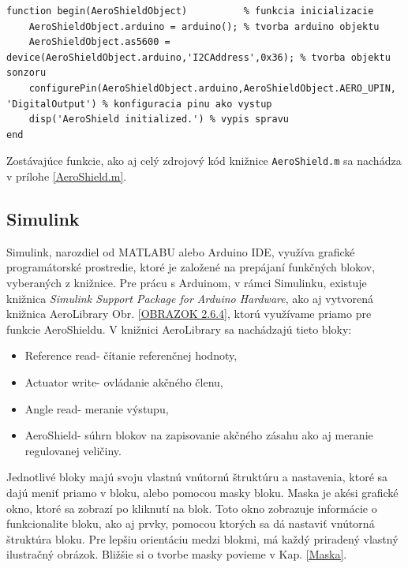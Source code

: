 \begin{lstlisting}[caption={Knižnica AeroShield.m properties.},captionpos=b]
function begin(AeroShieldObject)          % funkcia inicializacie
	AeroShieldObject.arduino = arduino(); % tvorba arduino objektu
	AeroShieldObject.as5600 = device(AeroShieldObject.arduino,'I2CAddress',0x36); % tvorba objektu sonzoru
	configurePin(AeroShieldObject.arduino,AeroShieldObject.AERO_UPIN, 'DigitalOutput') % konfiguracia pinu ako vystup
	disp('AeroShield initialized.') % vypis spravu
end
\end{lstlisting}

Zostávajúce funkcie, ako aj celý zdrojový kód knižnice \verb|AeroShield.m| sa nachádza v prílohe \ref{AeroShield.m}. 

\newpage
\subsection{Simulink}
\label{SimulinkLib}

Simulink, narozdiel od MATLABU alebo Arduino IDE, využíva grafické programátorské prostredie, ktoré je založené na prepájaní funkčných blokov, vyberaných z knižnice. Pre prácu s Arduinom, v rámci Simulinku, existuje knižnica \textit{Simulink Support Package for Arduino Hardware}, ako aj vytvorená knižnica AeroLibrary Obr. \ref{OBRAZOK 2.6.4}, ktorú využívame priamo pre funkcie AeroShieldu. V knižnici AeroLibrary sa nachádzajú tieto bloky: 
\begin{itemize}
	\item Reference read- čítanie referenčnej hodnoty, 
	\item Actuator write- ovládanie akčného členu, 
	\item Angle read- meranie výstupu, 
	\item AeroShield- súhrn blokov na zapisovanie akčného zásahu ako aj meranie regulovanej veličiny.
\end{itemize}
Jednotlivé bloky majú svoju vlastnú vnútornú štruktúru a nastavenia, ktoré sa dajú meniť priamo v bloku, alebo pomocou masky bloku. Maska je akési grafické okno, ktoré sa zobrazí po kliknutí na blok. Toto okno zobrazuje informácie o funkcionalite bloku, ako aj prvky, pomocou ktorých sa dá nastaviť vnútorná štruktúra bloku. Pre lepšiu orientáciu medzi blokmi, má každý priradený vlastný ilustračný obrázok. Bližšie si o tvorbe masky povieme v Kap. \ref{Maska}. 

